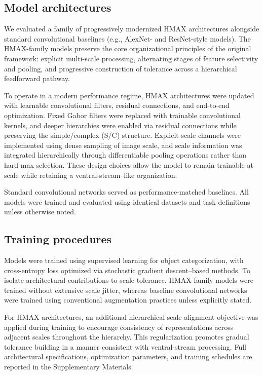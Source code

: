 \documentclass[pdflatex,sn-nature]{sn-jnl}
\begin{document}
\subsection{Model architectures}

We evaluated a family of progressively modernized HMAX architectures alongside standard convolutional baselines (e.g., AlexNet- and ResNet-style models). The HMAX-family models preserve the core organizational principles of the original framework: explicit multi-scale processing, alternating stages of feature selectivity and pooling, and progressive construction of tolerance across a hierarchical feedforward pathway. 

To operate in a modern performance regime, HMAX architectures were updated with learnable convolutional filters, residual connections, and end-to-end optimization. Fixed Gabor filters were replaced with trainable convolutional kernels, and deeper hierarchies were enabled via residual connections while preserving the simple/complex (S/C) structure. Explicit scale channels were implemented using dense sampling of image scale, and scale information was integrated hierarchically through differentiable pooling operations rather than hard max selection. These design choices allow the model to remain trainable at scale while retaining a ventral-stream--like organization.

Standard convolutional networks served as performance-matched baselines. All models were trained and evaluated using identical datasets and task definitions unless otherwise noted.

\subsection{Training procedures}

Models were trained using supervised learning for object categorization, with cross-entropy loss optimized via stochastic gradient descent--based methods. To isolate architectural contributions to scale tolerance, HMAX-family models were trained without extensive scale jitter, whereas baseline convolutional networks were trained using conventional augmentation practices unless explicitly stated. 

For HMAX architectures, an additional hierarchical scale-alignment objective was applied during training to encourage consistency of representations across adjacent scales throughout the hierarchy. This regularization promotes gradual tolerance building in a manner consistent with ventral-stream processing. Full architectural specifications, optimization parameters, and training schedules are reported in the Supplementary Materials.
\end{document}

